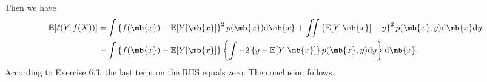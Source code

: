 \begin{exercise}
\begin{enumerate}
\begin{solution}
                Then we have
                \begin{align*}
                    \mathbb{E}[\ell(Y, f(X))]
                    = & \int\left\{f(\mb{x})-\mathbb{E}[Y|\mb{x}]\right\}^{2} p(\mb{x})\mathrm{d}\mb{x} + \iint\left\{\mathbb{E}[Y|\mb{x}]-y\right\}^{2} p(\mb{x}, y) \mathrm{d}\mb{x}\mathrm{d}y \\
                    - & \int\left\{f(\mb{x})-\mathbb{E}[Y|\mb{x}]\right\}\left\{\int-2\left\{y-\mathbb{E}[Y|\mb{x}]\right\} p(\mb{x}, y)\mathrm{d}y\right\} \mathrm{d}\mb{x}.
                \end{align*}
                According to Exercise 6.3, the last term on the RHS equals zero. The conclusion follows.
                \qedhere
            \end{solution}
    \end{enumerate}
\end{exercise}
\newpage




